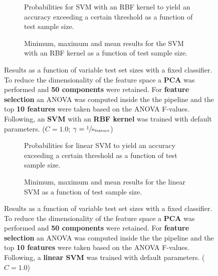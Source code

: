 \begin{figure}
    \captionsetup[subfigure]{justification=justified,singlelinecheck=false}
    \begin{subfigure}[t]{0.61\textwidth}
        
        \caption{Probabilities for SVM with an RBF kernel to yield an accuracy exceeding a certain threshold as a function of test sample size.}
    \end{subfigure}
    \hspace{3.0mm}
    \begin{subfigure}[t]{0.34\textwidth}
        
        \caption{Minimum, maximum and mean results for the SVM with an RBF kernel as a function of test sample size.}
    \end{subfigure}
    \caption[Effects of varying test sample size. SVM (kernel = RBF); Preprocessing: PCA ($n_\text{components} = \num{50}$); ANOVA feature selection ($k_\text{best} = \num{10}$)]{Results as a function of variable test set sizes with a fixed classifier. To reduce the dimensionality of the feature space a \textbf{PCA} was performed and \textbf{50 components} were retained. For \textbf{feature selection} an ANOVA was computed inside the the pipeline and the top \textbf{10 features} were taken based on the ANOVA F-values. Following, an \textbf{{SVM}} with an \textbf{{RBF kernel}} was trained with default parameters. ($C=\num{1.0}$; $\gamma=\sfrac{1}{n_\text{feature}}$)}
    \label{fig:PCA_50_components_10_best_selected_SVC}
\end{figure}

\begin{figure}
    \captionsetup[subfigure]{justification=justified,singlelinecheck=false}
    \begin{subfigure}[t]{0.61\textwidth}
        
        \caption{Probabilities for linear SVM to yield an accuracy exceeding a certain threshold as a function of test sample size.}
    \end{subfigure}
    \hspace{3.0mm}
    \begin{subfigure}[t]{0.34\textwidth}
        
        \caption{Minimum, maximum and mean results for the linear SVM as a function of test sample size.}
    \end{subfigure}
    \caption[Effects of varying test sample size. Linear SVM; Preprocessing: PCA ($n_\text{components} = \num{50}$); ANOVA feature selection ($k_\text{best} = \num{10}$)]{Results as a function of variable test set sizes with a fixed classifier. To reduce the dimensionality of the feature space a \textbf{PCA} was performed and \textbf{50 components} were retained. For \textbf{feature selection} an ANOVA was computed inside the the pipeline and the top \textbf{10 features} were taken based on the ANOVA F-values. Following, a \textbf{{linear SVM}} was trained with default parameters. ($C=\num{1.0}$)}
    \label{fig:PCA_50_components_10_best_selected_LinearSVC}
\end{figure}

